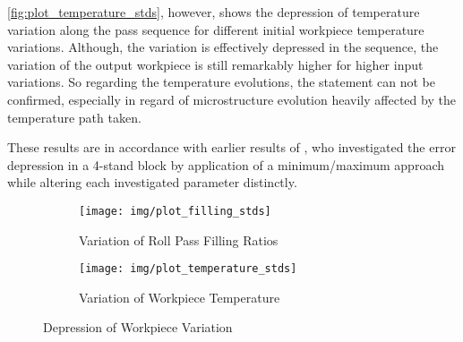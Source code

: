 \autoref{fig:plot_temperature_stds}, however, shows the depression of temperature variation along the pass sequence for different initial workpiece temperature variations.
Although, the variation is effectively depressed in the sequence, the variation of the output workpiece is still remarkably higher for higher input variations.
So regarding the temperature evolutions, the statement can not be confirmed, especially in regard of microstructure evolution heavily affected by the temperature path taken.

These results are in accordance with earlier results of \textcite{Mauk1999}, who investigated the error depression in a 4-stand block by application of a minimum/maximum approach while altering each investigated parameter distinctly.

\begin{figure}
    \begin{subfigure}{\linewidth}
        \centering
        \texttt{[image: img/plot\_filling\_stds]}
        \caption{Variation of Roll Pass Filling Ratios}
        \label{fig:plot_filling_stds}
    \end{subfigure}
    \begin{subfigure}{\linewidth}
        \centering
        \texttt{[image: img/plot\_temperature\_stds]}
        \caption{Variation of Workpiece Temperature}
        \label{fig:plot_temperature_stds}
    \end{subfigure}
    \caption{Depression of Workpiece Variation}
\end{figure}